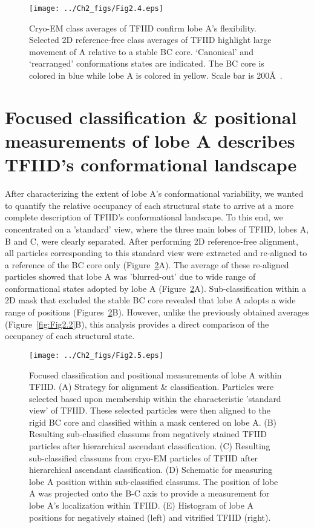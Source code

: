\begin{figure}
\centering
\texttt{[image: ../Ch2\_figs/Fig2.4.eps]}
\caption[Cryo-EM class averages of TFIID confirm lobe A’s flexibility]{Cryo-EM class averages of TFIID confirm lobe A’s flexibility. Selected 2D reference-free class averages of TFIID highlight large movement of A relative to a stable BC core.  ‘Canonical’ and ‘rearranged’ conformations states are indicated. The BC core is colored in blue while lobe A is colored in yellow. Scale bar is 200\AA\ .}
\label{fig:Fig2.4}
\end{figure}
\section{Focused classification \& positional measurements of lobe A describes TFIID's conformational landscape}
After characterizing the extent of lobe A's conformational variability, we wanted to quantify the relative occupancy of each structural state to arrive at a more complete description of TFIID's conformational landscape. To this end, we concentrated on a 'standard' view, where the three main lobes of TFIID, lobes A, B and C, were clearly separated. After performing 2D reference-free alignment, all particles corresponding to this standard view were extracted and re-aligned to a reference of the BC core only (Figure~\ref{fig:Fig2.5}A). The average of these re-aligned particles showed that lobe A was 'blurred-out' due to wide range of conformational states adopted by lobe A (Figure~\ref{fig:Fig2.5}A). Sub-classification within a 2D mask that excluded the stable BC core revealed that lobe A adopts a wide range of positions (Figures~\ref{fig:Fig2.5}B). However, unlike the previously obtained averages (Figure~\ref{fig:Fig2.2}B), this analysis provides a direct comparison of the occupancy of each structural state. \\
\begin{figure}
\centering
\texttt{[image: ../Ch2\_figs/Fig2.5.eps]}
\caption[Focused classification and positional measurements of lobe A within TFIID]{Focused classification and positional measurements of lobe A within TFIID. (A) Strategy for alignment \& classification.  Particles were selected based upon membership within the characteristic 'standard view' of TFIID.  These selected particles were then aligned to the rigid BC core and classified within a mask centered on lobe A. (B) Resulting sub-classified classums from negatively stained TFIID particles after hierarchical ascendant classification. (C) Resulting sub-classified classums from cryo-EM particles of TFIID after hierarchical ascendant classification. (D) Schematic for measuring lobe A position within sub-classified classums.  The position of lobe A was projected onto the B-C axis to provide a measurement for lobe A’s localization within TFIID. (E) Histogram of lobe A positions for negatively stained (left) and vitrified TFIID (right).}
\label{fig:Fig2.5}
\end{figure}
